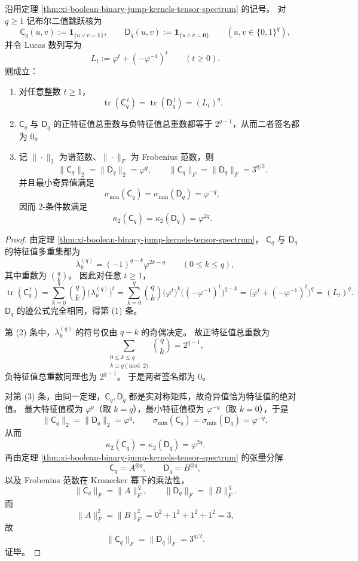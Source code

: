 \begin{theorem}\label{thm:conclusion-boolean-jump-kernel-lucas-inertia-norm}
沿用定理 \ref{thm:xi-boolean-binary-jump-kernels-tensor-spectrum} 的记号。
对 \(q\ge 1\) 记布尔二值跳跃核为
\[
\mathsf C_q(u,v):=\mathbf 1_{\{u\vee v=\mathbf 1\}},
\qquad
\mathsf D_q(u,v):=\mathbf 1_{\{u\wedge v=\mathbf 0\}}
\qquad
(u,v\in\{0,1\}^q),
\]
并令 Lucas 数列写为
\[
L_t:=\varphi^t+(-\varphi^{-1})^t
\qquad (t\ge 0).
\]
则成立：
\begin{enumerate}
  \item 对任意整数 \(t\ge 1\)，
  \[
  \operatorname{tr}(\mathsf C_q^{\,t})
  =
  \operatorname{tr}(\mathsf D_q^{\,t})
  =
  (L_t)^q.
  \]
  \item \(\mathsf C_q\) 与 \(\mathsf D_q\) 的正特征值总重数与负特征值总重数都等于 \(2^{q-1}\)，从而二者签名都为 \(0\)。
  \item 记 \(\|\cdot\|_2\) 为谱范数、\(\|\cdot\|_F\) 为 Frobenius 范数，则
  \[
  \|\mathsf C_q\|_2=\|\mathsf D_q\|_2=\varphi^q,
  \qquad
  \|\mathsf C_q\|_F=\|\mathsf D_q\|_F=3^{q/2}.
  \]
  并且最小奇异值满足
  \[
  \sigma_{\min}(\mathsf C_q)=\sigma_{\min}(\mathsf D_q)=\varphi^{-q},
  \]
  因而 \(2\)-条件数满足
  \[
  \kappa_2(\mathsf C_q)=\kappa_2(\mathsf D_q)=\varphi^{2q}.
  \]
\end{enumerate}
\end{theorem}
\begin{proof}
由定理 \ref{thm:xi-boolean-binary-jump-kernels-tensor-spectrum}，
\(\mathsf C_q\) 与 \(\mathsf D_q\) 的特征值多重集都为
\[
\lambda_k^{(q)}=(-1)^{q-k}\varphi^{2k-q}
\qquad (0\le k\le q),
\]
其中重数为 \(\binom qk\)。
因此对任意 \(t\ge 1\)，
\[
\operatorname{tr}(\mathsf C_q^{\,t})
=
\sum_{k=0}^{q}\binom qk\bigl(\lambda_k^{(q)}\bigr)^t
=
\sum_{k=0}^{q}\binom qk
\bigl(\varphi^t\bigr)^k
\bigl((-\varphi^{-1})^t\bigr)^{q-k}
=
\bigl(\varphi^t+(-\varphi^{-1})^t\bigr)^q
=
(L_t)^q.
\]
\(\mathsf D_q\) 的迹公式完全相同，得第 (1) 条。

第 (2) 条中，\(\lambda_k^{(q)}\) 的符号仅由 \(q-k\) 的奇偶决定。
故正特征值总重数为
\[
\sum_{\substack{0\le k\le q\\ k\equiv q\!\!\!\pmod 2}}\binom qk=2^{q-1},
\]
负特征值总重数同理也为 \(2^{q-1}\)。
于是两者签名都为 \(0\)。

对第 (3) 条，由同一定理，\(\mathsf C_q,\mathsf D_q\) 都是实对称矩阵，故奇异值恰为特征值的绝对值。
最大特征值模为 \(\varphi^q\)（取 \(k=q\)），最小特征值模为 \(\varphi^{-q}\)（取 \(k=0\)），于是
\[
\|\mathsf C_q\|_2=\|\mathsf D_q\|_2=\varphi^q,
\qquad
\sigma_{\min}(\mathsf C_q)=\sigma_{\min}(\mathsf D_q)=\varphi^{-q},
\]
从而
\[
\kappa_2(\mathsf C_q)=\kappa_2(\mathsf D_q)=\varphi^{2q}.
\]
再由定理 \ref{thm:xi-boolean-binary-jump-kernels-tensor-spectrum} 的张量分解
\[
\mathsf C_q=A^{\otimes q},
\qquad
\mathsf D_q=B^{\otimes q},
\]
以及 Frobenius 范数在 Kronecker 幂下的乘法性，
\[
\|\mathsf C_q\|_F=\|A\|_F^{\,q},
\qquad
\|\mathsf D_q\|_F=\|B\|_F^{\,q}.
\]
而
\[
\|A\|_F^2=\|B\|_F^2=0^2+1^2+1^2+1^2=3,
\]
故
\[
\|\mathsf C_q\|_F=\|\mathsf D_q\|_F=3^{q/2}.
\]
证毕。
\end{proof}
